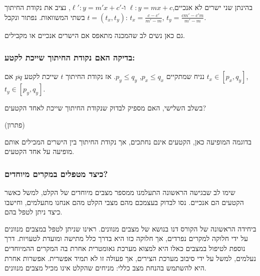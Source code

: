 \documentclass[
]{book}
\begin{document}
בהינתן שני ישרים לא אנכיים,\(\ell: y= m x + c\) ו-\(\ell': y= m'x+ c'\),
נציב את נקודת החיתוך \(t=(t_x,t_y)\) בשתי המשוואות. נפתור ונקבל:
\(t_x=\frac{c-c'}{m'-m}\), \(t_y=\frac{cm'-c'm}{m'-m}\).

גם כאן נשים לב שהמכנה מתאפס אם הישרים אנכיים או מקבילים.

\hypertarget{ux5d1ux5d3ux5d9ux5e7ux5d4-ux5d4ux5d0ux5dd-ux5e0ux5e7ux5d5ux5d3ux5ea-ux5d4ux5d7ux5d9ux5eaux5d5ux5da-ux5e9ux5d9ux5d9ux5dbux5ea-ux5dcux5e7ux5d8ux5e2}{%
\subsubsection*{בדיקה האם נקודת החיתוך שייכת לקטע:}\label{ux5d1ux5d3ux5d9ux5e7ux5d4-ux5d4ux5d0ux5dd-ux5e0ux5e7ux5d5ux5d3ux5ea-ux5d4ux5d7ux5d9ux5eaux5d5ux5da-ux5e9ux5d9ux5d9ux5dbux5ea-ux5dcux5e7ux5d8ux5e2}}

נניח שמתקיים \(p_x\le q_x\), \(p_y\le q_y\). אז נקודת החיתוך \(t\) שייכת לקטע
\(\overline{p q}\) אם \(t_x\in [p_x, q_y]\), \(t_y\in[p_y, q_y]\).

בשלב השלישי, האם מספיק לבדוק שנקודת החיתוך שייכת לאחד הקטעים?

(פתרון)

בדוגמה המופיעה כאן, הקטעים אינם נחתכים, אך נקודת החיתוך בין הישרים
המכילים אותם מופיעה על אחד הקטעים.

\hypertarget{ux5dbux5d9ux5e6ux5d3-ux5deux5d8ux5e4ux5dcux5d9ux5dd-ux5d1ux5deux5e7ux5e8ux5d9ux5dd-ux5deux5d9ux5d5ux5d7ux5d3ux5d9ux5dd}{%
\subsubsection*{כיצד מטפלים במקרים מיוחדים?}\label{ux5dbux5d9ux5e6ux5d3-ux5deux5d8ux5e4ux5dcux5d9ux5dd-ux5d1ux5deux5e7ux5e8ux5d9ux5dd-ux5deux5d9ux5d5ux5d7ux5d3ux5d9ux5dd}}

שימו לב שבגישה הראשונה התעלמנו ממספר מצבים מיוחדים של הקלט, למשל כאשר
הקטעים הם אנכיים. נסו לבדוק בעצמכם מהם מצבי הקלט מהם אנחנו מתעלמים,
וחישבו כיצד ניתן לטפל בהם.

ביחידה הראשונה של הקורס דנו בנושא של מצבים מנוונים. ראינו שניתן לטפל
במצבים מנוונים על ידי חלוקה למקרים נפרדים, אך חלוקה כזו היא בדרך כלל
מתישה ומועדת לטעויות. דרך נוספת לטיפול במצבים כאלו היא למצוא מערכת
גאומטרית אחרת בה המקרים ההמיוחדים נעלמים, למשל על ידי סיבוב מערכת
הצירים, אך פעולה זו לא תמיד אפשרית. אפשרות אחרת היא להשתמש בהנחת מצב
כללי: מניחים שהקלט אינו מכיל מצבים מנוונים.
\end{document}
